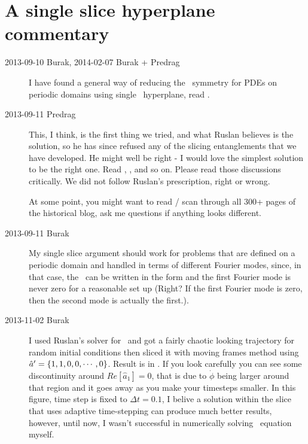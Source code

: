 

\section{A single slice hyperplane commentary}
\begin{description}

\item[2013-09-10 Burak, 2014-02-07 Burak + Predrag]
I have found a general way of reducing the \ symmetry for PDEs on
periodic domains using single \slice\ hyperplane, read
.

\item[2013-09-11 Predrag] This, I think, is the first thing we tried,
and what Ruslan believes is the solution, so he has since refused any of
the slicing entanglements that we have developed.
He might well be right - I would love the simplest solution to be the
right one. Read
,
,
 and so on. Please read those discussions critically.
We did not follow Ruslan's prescription, right or wrong.

At some point, you might want to read / scan through
all 300+ pages of the historical blog, ask me
questions if anything looks different.

\item[2013-09-11 Burak] My single slice argument should work for problems
that are defined on a periodic domain and handled in terms of different
Fourier modes, since, in that case, the \Lg\ can be written in the form
 and the first Fourier mode is never
zero for a reasonable set up (Right? If the first Fourier mode is zero,
then the second mode is actually the first.).

\item[2013-11-02 Burak] I used Ruslan's solver for \KS\ and got a fairly chaotic
looking trajectory for random initial conditions then sliced it with moving
frames method using $\hat{a}'=\{1,1,0,0,\cdots,0\}$.
Result is in . If you look carefully you can see
some discontinuity around $Re[\hat{a}_1] = 0$, that is due to $\dot{\phi}$
being larger around that region and it goes away as you make your timesteps
smaller. In this figure, time step is fixed to $\Delta t = 0.1$, I belive
a solution within the slice that uses adaptive time-stepping can produce much
better results, however, until now, I wasn't successful in numerically solving
\KS\ equation myself.


\end{description}
